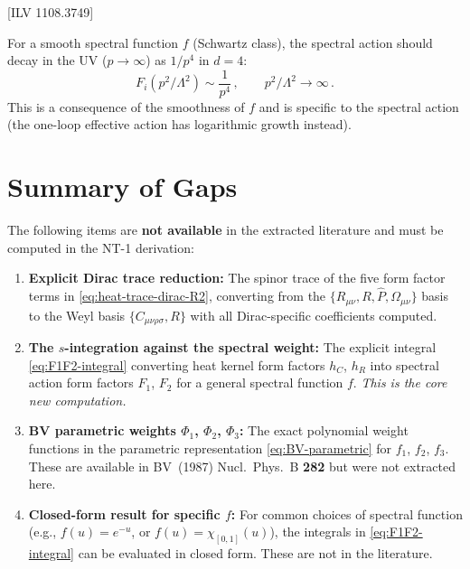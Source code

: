 \documentclass[12pt,a4paper]{article}
\theoremstyle{definition}
\theoremstyle{remark}
\newcommand{\fromlit}[1]{\textcolor{blue!70!black}{\textsf{[#1]}}}
\begin{document}
\fromlit{ILV 1108.3749}

For a smooth spectral function $f$ (Schwartz class), the spectral
action should decay in the UV ($p \to \infty$) as $1/p^4$ in $d=4$:
\begin{equation}
  F_i(p^2/\Lambda^2) \sim \frac{1}{p^4}\,,
  \qquad p^2/\Lambda^2 \to \infty\,.
  \label{eq:UV-decay}
\end{equation}
This is a consequence of the smoothness of $f$ and is specific to the
spectral action (the one-loop effective action has logarithmic growth
instead).


\newpage
\section*{Summary of Gaps}

The following items are \textbf{not available} in the extracted
literature and must be computed in the NT-1 derivation:

\begin{enumerate}
\item \textbf{Explicit Dirac trace reduction:}
  The spinor trace of the five form factor terms in
  \eqref{eq:heat-trace-dirac-R2}, converting from the
  $\{R_{\mu\nu},R,\hat{P},\Omega_{\mu\nu}\}$ basis to the
  Weyl basis $\{C_{\mu\nu\rho\sigma},R\}$ with all Dirac-specific
  coefficients computed.

\item \textbf{The $s$-integration against the spectral weight:}
  The explicit integral \eqref{eq:F1F2-integral} converting
  heat kernel form factors $h_C$, $h_R$ into spectral action
  form factors $F_1$, $F_2$ for a general spectral function $f$.
  \emph{This is the core new computation.}

\item \textbf{BV parametric weights $\Phi_1$, $\Phi_2$, $\Phi_3$:}
  The exact polynomial weight functions in the parametric
  representation \eqref{eq:BV-parametric} for $f_1$, $f_2$, $f_3$.
  These are available in BV~(1987) Nucl.\ Phys.\ B \textbf{282}
  but were not extracted here.

\item \textbf{Closed-form result for specific $f$:}
  For common choices of spectral function (e.g., $f(u)=e^{-u}$,
  or $f(u)=\chi_{[0,1]}(u)$), the integrals in
  \eqref{eq:F1F2-integral} can be evaluated in closed form.
  These are not in the literature.
\end{enumerate}
\end{document}
